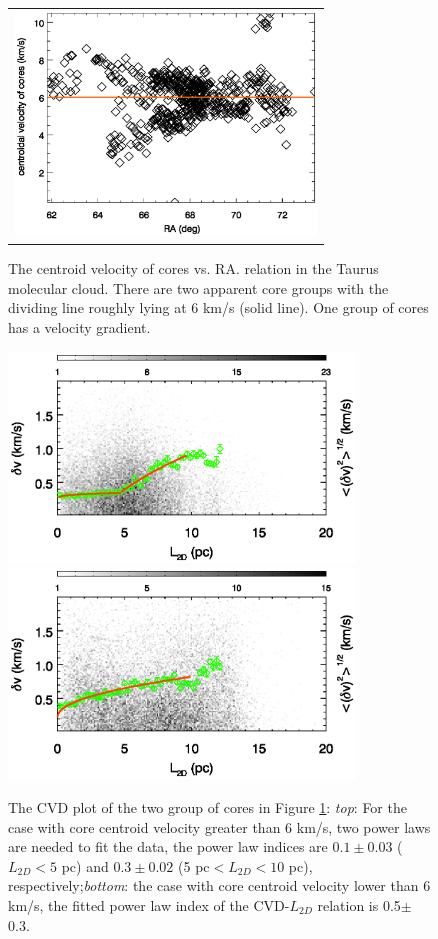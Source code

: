 \documentclass[iop,revtex4]{emulateapj}
\begin{document}
\begin{figure}[htbp]
\centering
\begin{tabular}{c}
\includegraphics[width=8cm]{tau_velocityra.eps}\\
\end{tabular}
\caption{The centroid velocity of cores vs. RA. relation in the Taurus molecular cloud. There are two apparent core groups with the
dividing line roughly lying at 6 km/s (solid line). One group of cores has a velocity gradient.} \label{fig:taurus_core_gradient}
\end{figure}

\begin{figure}[htbp]
\begin{minipage}[b]{0.45\textwidth}
  \includegraphics[width=9.2cm]{tau_vdis_all_gt6.eps}\\
  \includegraphics[width=9.2cm]{tau_vdis_all_lt6.eps}
\end{minipage}
\caption{The CVD plot of the two group of cores in Figure \ref{fig:taurus_core_gradient}: {\it top}: For the case with core centroid velocity greater than 6 km/s, two power laws are needed to fit the data, the power law indices are $0.1\pm 0.03$ ($L_{2D}<5$ pc) and $0.3\pm 0.02$ (5 pc$<L_{2D}<10$ pc), respectively;{\it bottom}: the case with core centroid velocity lower than 6 km/s, the fitted power law index of the CVD-$L_{2D}$ relation is 0.5$\pm$0.3.}\label{fig:taurus_group}
\end{figure}
\end{document}
